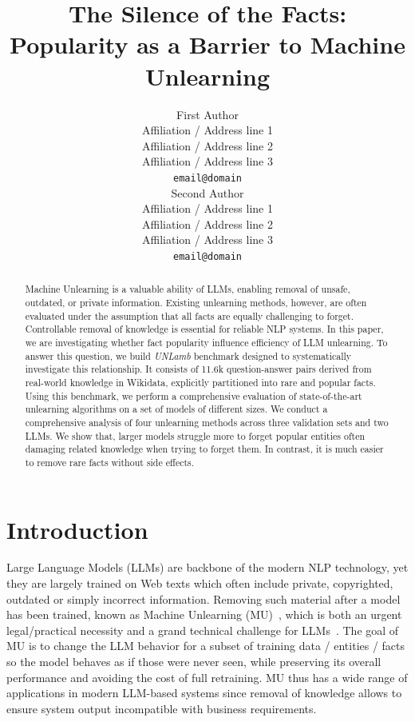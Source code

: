 \documentclass[11pt]{article}
\title{The Silence of the Facts: Popularity as a Barrier to Machine Unlearning}
\author{First Author \\
  Affiliation / Address line 1 \\
  Affiliation / Address line 2 \\
  Affiliation / Address line 3 \\
  \texttt{email@domain} \\\And
  Second Author \\
  Affiliation / Address line 1 \\
  Affiliation / Address line 2 \\
  Affiliation / Address line 3 \\
  \texttt{email@domain} \\}
\begin{document}
\maketitle
\begin{abstract}
Machine Unlearning is a valuable ability of LLMs, enabling removal of unsafe, outdated, or private information. Existing unlearning methods, however, are often evaluated under the assumption that all facts are equally challenging to forget. Controllable removal of knowledge is essential for reliable NLP systems. In this paper, we are investigating whether fact popularity influence efficiency of LLM unlearning. 
%
To answer this question, we build \textit{UNLamb} benchmark designed to systematically investigate this relationship. It consists of 11.6k question-answer pairs derived from real-world knowledge in Wikidata, explicitly partitioned into rare and popular facts. Using this benchmark, we perform a comprehensive evaluation of state-of-the-art unlearning algorithms on a set of models of different sizes. 
We conduct a comprehensive analysis of four unlearning methods%
across three validation sets and two LLMs. We show that, larger models struggle more to forget popular  entities often damaging related knowledge when trying to forget them. In contrast, it is much easier to remove rare facts without side effects. %
\end{abstract}





\section{Introduction}
\label{sec:intro}

Large Language Models (LLMs) are backbone of the modern NLP technology, yet they  are largely trained on Web texts which often include private, copyrighted, outdated or simply incorrect information. Removing such material after a model has been trained, known as Machine Unlearning (MU)~\cite{jang2023knowledge, zagardo2024more, shaik2024exploring}, which is both an urgent legal/practical necessity and a grand technical challenge for LLMs~\cite{jang2023knowledge,wei2024evaluating,geng2025comprehensive}. The goal of MU is to change the LLM behavior for a subset of training data / entities / facts so the model behaves as if those were never seen, while preserving its overall performance and avoiding the cost of full retraining. MU thus has a wide range of applications in modern LLM-based  systems since removal of knowledge allows to ensure system output incompatible with business requirements.
\end{document}
